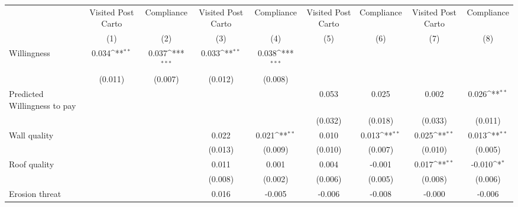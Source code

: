 {
\def\sym#1{\ifmmode^{#1}\else\(^{#1}\)\fi}
\begin{tabular}{l*{8}{c}}
\toprule
                &\multicolumn{1}{c}{Visited Post Carto}&\multicolumn{1}{c}{Compliance}&\multicolumn{1}{c}{Visited Post Carto}&\multicolumn{1}{c}{Compliance}&\multicolumn{1}{c}{Visited Post Carto}&\multicolumn{1}{c}{Compliance}&\multicolumn{1}{c}{Visited Post Carto}&\multicolumn{1}{c}{Compliance}\\
                &\multicolumn{1}{c}{(1)}         &\multicolumn{1}{c}{(2)}         &\multicolumn{1}{c}{(3)}         &\multicolumn{1}{c}{(4)}         &\multicolumn{1}{c}{(5)}         &\multicolumn{1}{c}{(6)}         &\multicolumn{1}{c}{(7)}         &\multicolumn{1}{c}{(8)}         \\
\midrule
Willingness     &    0.034\sym{**} &    0.037\sym{***}&    0.033\sym{**} &    0.038\sym{***}&                  &                  &                  &                  \\
                &  (0.011)         &  (0.007)         &  (0.012)         &  (0.008)         &                  &                  &                  &                  \\
Predicted Willingness to pay&                  &                  &                  &                  &    0.053         &    0.025         &    0.002         &    0.026\sym{**} \\
                &                  &                  &                  &                  &  (0.032)         &  (0.018)         &  (0.033)         &  (0.011)         \\
Wall quality    &                  &                  &    0.022         &    0.021\sym{**} &    0.010         &    0.013\sym{**} &    0.025\sym{**} &    0.013\sym{**} \\
                &                  &                  &  (0.013)         &  (0.009)         &  (0.010)         &  (0.007)         &  (0.010)         &  (0.005)         \\
Roof quality    &                  &                  &    0.011         &    0.001         &    0.004         &   -0.001         &    0.017\sym{**} &   -0.010\sym{*}  \\
                &                  &                  &  (0.008)         &  (0.002)         &  (0.006)         &  (0.005)         &  (0.008)         &  (0.006)         \\
Erosion threat  &                  &                  &    0.016         &   -0.005         &   -0.006         &   -0.008         &   -0.000         &   -0.006         \\

\end{tabular}}
